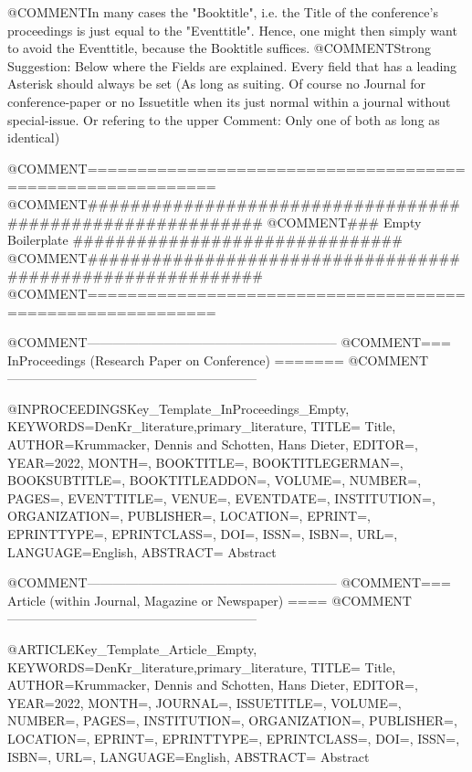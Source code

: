 
@COMMENT{In many cases the "Booktitle", i.e. the Title of the conference's proceedings is just equal to the "Eventtitle". Hence, one might then simply want to avoid the Eventtitle, because the Booktitle suffices.}
@COMMENT{Strong Suggestion: Below where the Fields are explained. Every field that has a leading Asterisk should always be set (As long as suiting. Of course no Journal for conference-paper or no Issuetitle when its just normal within a journal without special-issue. Or refering to the upper Comment: Only one of both as long as identical)}




@COMMENT{===========================================================}
@COMMENT{###########################################################}
@COMMENT{###    Empty Boilerplate    ###############################}
@COMMENT{###########################################################}
@COMMENT{===========================================================}


@COMMENT{-----------------------------------------------------------}
@COMMENT{===  InProceedings  (Research Paper on Conference)  =======}
@COMMENT{-----------------------------------------------------------}

@INPROCEEDINGS{Key_Template_InProceedings_Empty,
    KEYWORDS={DenKr_literature,primary_literature},
    TITLE={\begingroup
        Title\endgroup},
    AUTHOR={Krummacker, Dennis and Schotten, Hans Dieter},
    EDITOR={},
    YEAR={2022},
    MONTH={},
    BOOKTITLE={},
    BOOKTITLEGERMAN={},
    BOOKSUBTITLE={},
    BOOKTITLEADDON={},
    VOLUME={},
    NUMBER={},
    PAGES={},
    EVENTTITLE={},
    VENUE={},
    EVENTDATE={},
    INSTITUTION={},
    ORGANIZATION={},
    PUBLISHER={},
    LOCATION={},
    EPRINT={},
    EPRINTTYPE={},
    EPRINTCLASS={},
    DOI={},
    ISSN={},
    ISBN={},
    URL={},
    LANGUAGE={English},
    ABSTRACT={\begingroup
        Abstract\endgroup}
}



@COMMENT{-----------------------------------------------------------}
@COMMENT{===  Article  (within Journal, Magazine or Newspaper)  ====}
@COMMENT{-----------------------------------------------------------}

@ARTICLE{Key_Template_Article_Empty,
    KEYWORDS={DenKr_literature,primary_literature},
    TITLE={\begingroup
        Title\endgroup},
    AUTHOR={Krummacker, Dennis and Schotten, Hans Dieter},
    EDITOR={},
    YEAR={2022},
    MONTH={},
    JOURNAL={},
    ISSUETITLE={},
    VOLUME={},
    NUMBER={},
    PAGES={},
    INSTITUTION={},
    ORGANIZATION={},
    PUBLISHER={},
    LOCATION={},
    EPRINT={},
    EPRINTTYPE={},
    EPRINTCLASS={},
    DOI={},
    ISSN={},
    ISBN={},
    URL={},
    LANGUAGE={English},
    ABSTRACT={\begingroup
        Abstract\endgroup}
}










